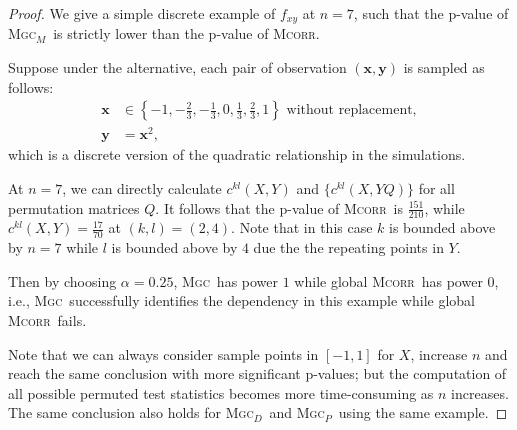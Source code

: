 \documentclass[11pt]{article}
\providecommand{\sct}[1]{{\normalfont\textsc{#1}}}
\providecommand{\mb}[1]{\boldsymbol{#1}}
\newcommand{\G}{c}
\newcommand{\Mgc}{\sct{Mgc}}
\newcommand{\Mgcp}{\sct{Mgc$_P$}}
\newcommand{\Mgcd}{\sct{Mgc$_D$}}
\newcommand{\Mgcm}{\sct{Mgc$_M$}}
\newcommand{\Mcorr}{\sct{Mcorr}}
\newcommand{\mbx}{\ensuremath{\mb{x}}}
\newcommand{\mby}{\ensuremath{\mb{y}}}
\newtheorem{appThm}{Theorem}
\begin{document}
\begin{proof}
We give a simple discrete example of $f_{xy}$ at $n=7$, such that the p-value of \Mgcm~is strictly lower than the p-value of \Mcorr.

Suppose under the alternative, each pair of observation $(\mbx,\mby)$ is sampled as follows:
\begin{align*}
\mbx &\in \left\{-1,-\frac{2}{3},-\frac{1}{3},0,\frac{1}{3},\frac{2}{3},1\right\} \mbox{ without replacement}, \\
\mby &= \mbx^2,
\end{align*}
which is a discrete version of the quadratic relationship in the simulations.

At $n=7$, we can directly calculate $\G^{kl}(X, Y)$ and $\{\G^{kl}(X, YQ)\}$ for all permutation matrices $Q$. It follows that the p-value of \Mcorr~is $\frac{151}{210}$, while $\G^{kl}(X, Y)=\frac{17}{70}$ at $(k,l)=(2,4)$. Note that in this case $k$ is bounded above by $n=7$ while $l$ is bounded above by $4$ due the the repeating points in $Y$.

Then by choosing $\alpha=0.25$, \Mgc~has power $1$ while global \Mcorr~has power $0$, i.e., \Mgc~successfully identifies the dependency in this example while global \Mcorr~fails.

Note that we can always consider sample points in $[-1,1]$ for $X$, increase $n$ and reach the same conclusion with more significant p-values; but the computation of all possible permuted test statistics becomes more time-consuming as $n$ increases. The same conclusion also holds for \Mgcd~and \Mgcp~using the same example.
\end{proof}






\end{document}

